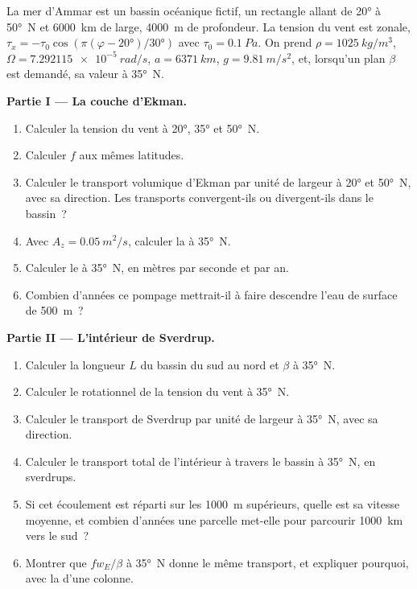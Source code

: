 \begin{problem}
\label{pb:b3:ocean-dynamics:1}
La mer d'Ammar est un bassin océanique fictif, un rectangle allant de \ang{20} à
\ang{50}~N et \qty{6000}{km} de large, \qty{4000}{m} de profondeur. La tension du vent est
zonale, $\tau_x = -\tau_0\cos(\pi(\varphi - \ang{20})/\ang{30})$ avec $\tau_0
= \qty{0.1}{Pa}$. On prend $\rho = \qty{1025}{kg/m^3}$, $\Omega =
\qty{7.292115e-5}{rad/s}$, $a = \qty{6371}{km}$, $g = \qty{9.81}{m/s^2}$,
et, lorsqu'un plan $\beta$ est demandé, sa valeur à \ang{35}~N.

\medskip\noindent\textbf{Partie I --- La couche d'Ekman.}
\begin{enumerate}
\item Calculer la tension du vent à \ang{20}, \ang{35} et \ang{50}~N.
\item Calculer $f$ aux mêmes latitudes.
\item Calculer le transport volumique d'Ekman par unité de largeur à \ang{20} et
  \ang{50}~N, avec sa direction. Les transports convergent-ils ou divergent-ils dans
  le bassin~?
\item Avec $A_z = \qty{0.05}{m^2/s}$, calculer la  à \ang{35}~N.
\item Calculer le  à \ang{35}~N, en mètres par seconde et par
  an.
\item Combien d'années ce pompage mettrait-il à faire descendre l'eau de surface
  de \qty{500}{m}~?
\end{enumerate}

\medskip\noindent\textbf{Partie II --- L'intérieur de Sverdrup.}
\begin{enumerate}[resume]
\item Calculer la longueur $L$ du bassin du sud au nord et $\beta$ à
  \ang{35}~N.
\item Calculer le rotationnel de la tension du vent à \ang{35}~N.
\item Calculer le transport de Sverdrup par unité de largeur à \ang{35}~N, avec sa
  direction.
\item Calculer le transport total de l'intérieur à travers le bassin à \ang{35}~N,
  en sverdrups.
\item Si cet écoulement est réparti sur les \qty{1000}{m} supérieurs, quelle est sa
  vitesse moyenne, et combien d'années une parcelle met-elle pour parcourir \qty{1000}{km}
  vers le sud~?
\item Montrer que $fw_E/\beta$ à \ang{35}~N donne le même transport, et expliquer
  pourquoi, avec la  d'une colonne.
\end{enumerate}


\end{problem}
